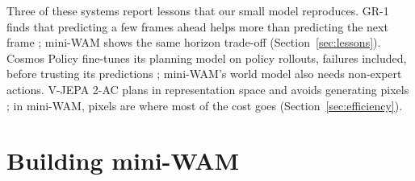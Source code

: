 \documentclass[11pt]{article}
\begin{document}
Three of these systems report lessons that our small model reproduces. GR-1 finds that predicting a few frames ahead helps more than predicting the next frame \citep{wu2023gr1}; mini-WAM shows the same horizon trade-off (Section~\ref{sec:lessons}). Cosmos Policy fine-tunes its planning model on policy rollouts, failures included, before trusting its predictions \citep{kim2026cosmospolicy}; mini-WAM's world model also needs non-expert actions. V-JEPA 2-AC plans in representation space and avoids generating pixels \citep{assran2025vjepa2}; in mini-WAM, pixels are where most of the cost goes (Section~\ref{sec:efficiency}).

\section{Building mini-WAM}
\label{sec:build}
\end{document}
